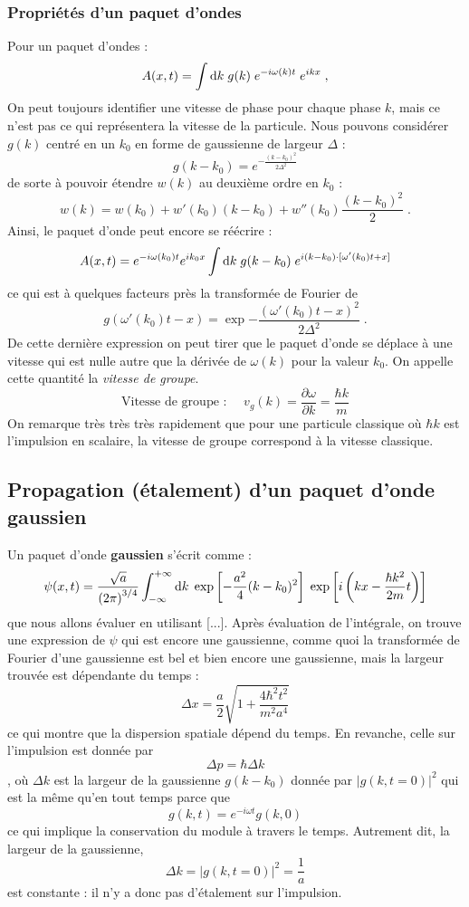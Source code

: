 \documentclass[12pt, a4paper]{book}
\begin{document}
\subsubsection{Propriétés d'un paquet d'ondes}
Pour un paquet d'ondes :
$$A(x, t) = \int \mathrm{d} k \; g(k) \; e^{-i\omega(k) t} \; e^{ikx} \; ,$$
On peut toujours identifier une vitesse de phase pour chaque phase $k$, mais ce n'est pas ce qui représentera la vitesse de la particule. Nous pouvons considérer $g(k)$ centré en un $k_0$ en forme de gaussienne de largeur $\Delta$ :
$$g(k-k_0) = e^{-\frac{(k-k_0)^2}{2\Delta^2}}$$
de sorte à pouvoir étendre $w(k)$ au deuxième ordre en $k_0$ :
$$ w(k) = w(k_0) + w'(k_0) (k-k_0) + w''(k_0) \frac{(k-k_0)^2}{2} \; .$$
Ainsi, le paquet d'onde peut encore se réécrire :
\begin{equation}
A(x,t) = e^{-i\omega(k_0)t} e^{ik_0x} \int \mathrm{d} k \; g(k-k_0) \; e^{i(k-k_0)\cdot [\omega'(k_0) t + x]}
\end{equation}
ce qui est à quelques facteurs près la transformée de Fourier de $$g(\omega'(k_0)t-x) = \exp{-\dfrac{(\omega'(k_0)t-x)^2}{2\Delta^2}} \; .$$
De cette dernière expression on peut tirer que le paquet d'onde se déplace à une vitesse qui est nulle autre que la dérivée de $\omega(k)$ pour la valeur $k_0$. On appelle cette quantité la \textit{vitesse de groupe}.
\begin{equation}
\boxed{
\text{Vitesse de groupe : } \quad v_g(k) = \dfrac{\partial \omega}{\partial k} = \dfrac{\hbar k}{m}
}
\end{equation}
On remarque très très très rapidement que pour une particule classique où $\hbar k$ est l'impulsion en scalaire, la vitesse de groupe correspond à la vitesse classique.

\subsection{Propagation (étalement) d'un paquet d'onde gaussien}
Un paquet d'onde \textbf{gaussien} s'écrit comme :
\begin{equation}
\psi(x, t) = \dfrac{\sqrt{a}}{\left(2\pi\right) ^{3/4}} \int_{-\infty} ^{+\infty} \mathrm{d} k \; \exp \left[-\dfrac{a^2}{4} (k-k_0)^2\right] \; \exp\left[i \left(kx - \dfrac{\hbar k^2}{2m}t\right)\right]
\end{equation}
que nous allons évaluer en utilisant [...]. Après évaluation de l'intégrale, on trouve une expression de $\psi$ qui est encore une gaussienne, comme quoi la transformée de Fourier d'une gaussienne est bel et bien encore une gaussienne, mais la largeur trouvée est dépendante du temps :
\begin{equation}
\Delta x = \dfrac{a}{2} \sqrt{ 1 + \dfrac{4 \hbar ^2 t^2}{m^2 a^4}}
\end{equation}
ce qui montre que la dispersion spatiale dépend du temps. En revanche, celle sur l'impulsion est donnée par $$\Delta p = \hbar \Delta k$$, où $\Delta k$ est la largeur de la gaussienne $g(k-k_0)$ donnée par $|g(k,t=0)|^2$ qui est la même qu'en tout temps parce que $$g(k,t) = e^{-i\omega t} g(k,0)$$ ce qui implique la conservation du module à travers le temps. Autrement dit, la largeur de la gaussienne, 
$$\Delta k = |g(k,t=0)|^2 = \dfrac{1}{a}$$
est constante : il n'y a donc pas d'étalement sur l'impulsion.
\end{document}
